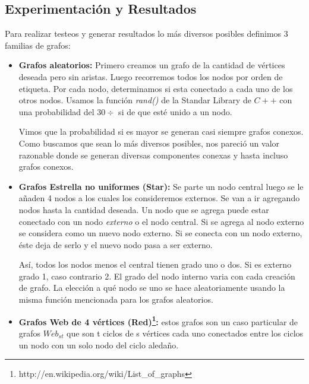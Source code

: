 \subsection{Experimentación y Resultados}

\quad Para realizar testeos y generar resultados lo más diversos posibles definimos 3 familias de grafos:

\begin{itemize}
\item \textbf{Grafos aleatorios:} \quad Primero creamos un grafo de la cantidad de vértices deseada pero sin aristas. Luego recorremos todos los nodos por orden de etiqueta. Por cada nodo, determinamos si esta conectado a cada uno de los otros nodos. Usamos la función \textit{rand()} de la Standar Library de $C++$ con una probabilidad del $ 30\div $ si de que esté unido a un nodo. 

 \quad Vimos que la probabilidad si es mayor se generan casi siempre grafos conexos. Como buscamos que sean lo más diversos posibles, nos pareció un valor razonable donde se generan diversas componentes conexas y hasta incluso grafos conexos.

\quad

\item \textbf{Grafos Estrella no uniformes (Star):} \quad Se parte un nodo central luego se le añaden 4 nodos a los cuales los consideremos externos. Se van a ir agregando nodos hasta la cantidad deseada. Un nodo que se agrega puede estar conectado con un nodo \textit{externo} o el nodo central. Si se agrega al nodo externo se considera como un nuevo nodo externo. Si se conecta con un nodo externo, éste deja de serlo y el nuevo nodo pasa a ser externo. 

\quad Así, todos los nodos menos el central tienen grado uno o dos. Si es externo grado 1, caso contrario 2. El grado del nodo interno varia con cada creación de grafo. La elección a qué nodo se uno se hace aleatoriamente usando la misma función mencionada para los grafos aleatorios.

\quad

\item \textbf{Grafos Web de 4 vértices (Red)\footnote{http://en.wikipedia.org/wiki/List\_of\_graphs}:} \quad estos grafos son un caso particular de grafos $ Web_{s t} $ que son t ciclos de s vértices cada uno conectados entre los ciclos un nodo con un solo nodo del ciclo aledaño. 
\end{itemize}

\quad

